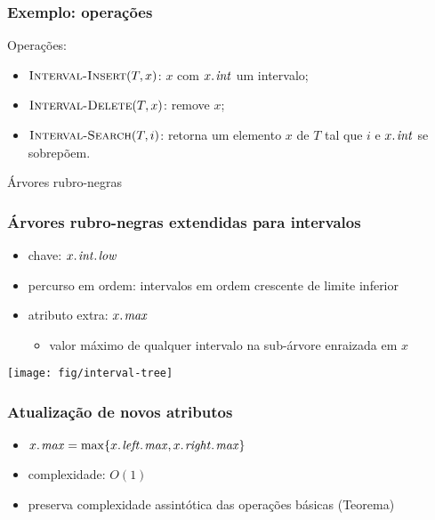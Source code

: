 \documentclass{beamer}
\begin{document}
\begin{frame}
\frametitle{Exemplo: operações}

Operações:
\begin{itemize}
\item $\textnormal{\scshape Interval-Insert}(T, x)$: $x$ com $\attrib{x}{int}$ um intervalo;
\item $\textnormal{\scshape Interval-Delete}(T, x)$: remove $x$;
\item $\textnormal{\scshape Interval-Search}(T, i)$: retorna um elemento $x$ de $T$ tal que
  $i$ e $\attrib{x}{int}$ se sobrepõem.
\end{itemize}

\pause
\alert{Árvores rubro-negras}

\end{frame}

\begin{frame}
\frametitle{Árvores rubro-negras extendidas para intervalos}

\begin{itemize}
\item chave: $\attrib{\attrib{x}{int}}{low}$
\item percurso em ordem: intervalos em ordem crescente de limite inferior
\item atributo extra: $\attrib{x}{max}$
\begin{itemize}
\item valor máximo de qualquer intervalo na sub-árvore enraizada em $x$
\end{itemize}
\end{itemize}

\begin{center}
\texttt{[image: fig/interval-tree]}
\end{center}

\end{frame}

\begin{frame}
\frametitle{Atualização de novos atributos}

\begin{itemize}
\item $\attrib{x}{max} = \max \{ \attrib{\attrib{x}{left}}{max}, \attrib{\attrib{x}{right}}{max} \}$
\item complexidade: $O(1)$
\item preserva complexidade assintótica das operações básicas (Teorema)
\end{itemize}

\end{frame}
\end{document}
